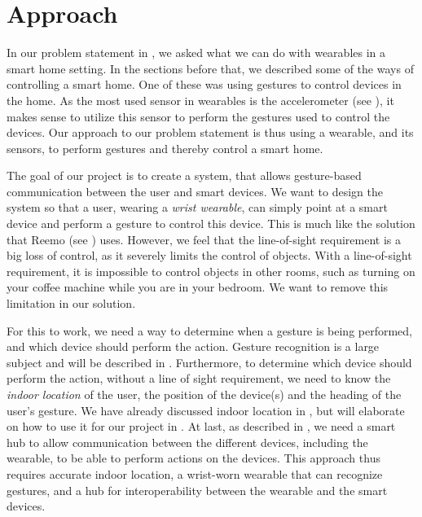 \section{Approach}\label{sec:approach}
In our problem statement in , 
we asked what we can do with wearables in a smart home setting.
In the sections before that, 
we described some of the ways of controlling a smart home. 
One of these was using gestures to control devices in the home. 
As the most used sensor in wearables is the accelerometer (see ), 
it makes sense to utilize this sensor to perform the gestures used to control the devices. 
Our approach to our problem statement is thus using a wearable, 
and its sensors, to perform gestures and thereby control a smart home. 

The goal of our project is to create a system, 
that allows gesture-based communication between the user and smart devices.
We want to design the system so that a user, wearing a \emph{wrist wearable}, 
can simply point at a smart device and perform a gesture to control this device. 
This is much like the solution that Reemo (see ) uses. 
However, we feel that the line-of-sight requirement is a big loss of control, 
as it severely limits the control of objects.
With a line-of-sight requirement, 
it is impossible to control objects in other rooms, 
such as turning on your coffee machine while you are in your bedroom. 
We want to remove this limitation in our solution. 

For this to work, we need a way to determine when a gesture is being performed, 
and which device should perform the action. 
Gesture recognition is a large subject and will be described in . 
Furthermore, to determine which device should perform the action, 
without a line of sight requirement, 
we need to know the \emph{indoor location} of the user, 
the position of the device(s) and the heading of the user's gesture. 
We have already discussed indoor location in , 
but will elaborate on how to use it for our project in .
At last, as described in , 
we need a smart hub to allow communication between the different devices, 
including the wearable, to be able to perform actions on the devices. 
This approach thus requires accurate indoor location, 
a wrist-worn wearable that can recognize gestures, 
and a hub for interoperability between the wearable and the smart devices. 

